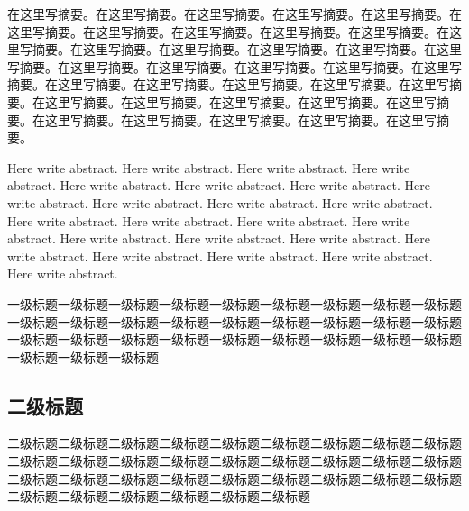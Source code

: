 \documentclass[12pt, a4paper, twoside]{article}
\begin{document}
\reAbstract %

在这里写摘要。在这里写摘要。在这里写摘要。在这里写摘要。在这里写摘要。在这里写摘要。在这里写摘要。在这里写摘要。在这里写摘要。在这里写摘要。在这里写摘要。在这里写摘要。在这里写摘要。在这里写摘要。在这里写摘要。在这里写摘要。在这里写摘要。在这里写摘要。在这里写摘要。在这里写摘要。在这里写摘要。在这里写摘要。在这里写摘要。在这里写摘要。在这里写摘要。在这里写摘要。在这里写摘要。在这里写摘要。在这里写摘要。在这里写摘要。在这里写摘要。在这里写摘要。在这里写摘要。在这里写摘要。在这里写摘要。在这里写摘要。


\reAbstractEN

Here write abstract. Here write abstract. Here write abstract. Here write abstract. Here write abstract. Here write abstract. Here write abstract. Here write abstract. Here write abstract. Here write abstract. Here write abstract. Here write abstract. Here write abstract. Here write abstract. Here write abstract. Here write abstract. Here write abstract. Here write abstract. Here write abstract. Here write abstract. Here write abstract. Here write abstract. Here write abstract. 


\begin{center}
    \tableofcontents
\end{center}



一级标题一级标题一级标题一级标题一级标题一级标题一级标题一级标题一级标题一级标题一级标题一级标题一级标题一级标题一级标题一级标题一级标题一级标题一级标题一级标题一级标题一级标题一级标题一级标题一级标题一级标题一级标题一级标题一级标题一级标题

\subsection{二级标题}
二级标题二级标题二级标题二级标题二级标题二级标题二级标题二级标题二级标题二级标题二级标题二级标题二级标题二级标题二级标题二级标题二级标题二级标题二级标题二级标题二级标题二级标题二级标题二级标题二级标题二级标题二级标题二级标题二级标题二级标题二级标题二级标题二级标题
\end{document}
